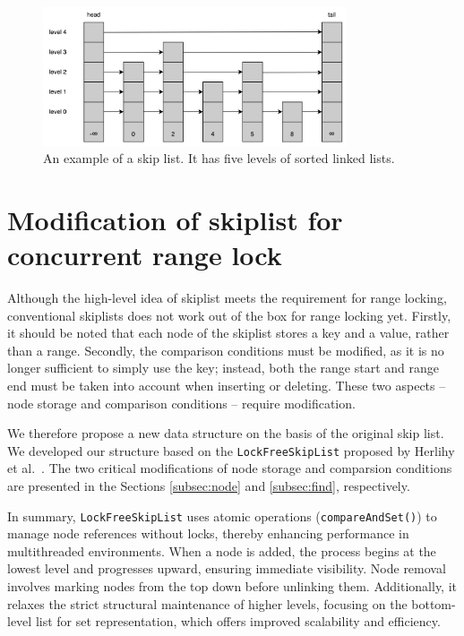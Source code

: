 \begin{figure}[h!]
    \centering
    \includegraphics[width=0.8\textwidth]{./figures/skiplist.png}
    \caption{An example of a skip list. It has five levels of sorted linked lists.}
    \label{fig:skiplist}
\end{figure}

\section{Modification of skiplist for concurrent range lock}

Although the high-level idea of skiplist meets the requirement for range locking, conventional skiplists does not work out of the box for range locking yet. 
Firstly, it should be noted that each node of the skiplist stores a key and a value, rather than a range. 
Secondly, the comparison conditions must be modified, as it is no longer sufficient to simply use the key; instead, both the range start and range end must be taken into account when inserting or deleting. 
These two aspects -- node storage and comparison conditions -- require modification.

We therefore propose a new data structure on the basis of the original skip list.
We developed our structure based on the \texttt{LockFreeSkipList} proposed by Herlihy et al.~\parencite{herlihy2020art}. 
The two critical modifications of node storage and comparsion conditions are presented in the Sections \ref{subsec:node} and \ref{subsec:find}, respectively.

In summary, \texttt{LockFreeSkipList} uses atomic operations (\texttt{compareAndSet()}) to manage node references without locks, thereby enhancing performance in multithreaded environments.
When a node is added, the process begins at the lowest level and progresses upward, ensuring immediate visibility. 
Node removal involves marking nodes from the top down before unlinking them. 
Additionally, it relaxes the strict structural maintenance of higher levels, focusing on the bottom-level list for set representation, which offers improved scalability and efficiency.

